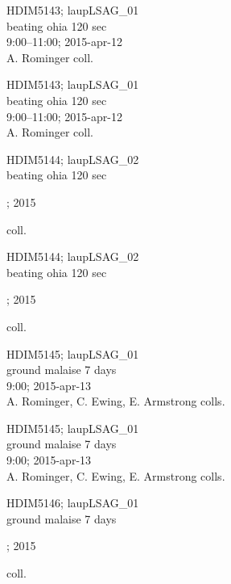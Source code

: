 \documentclass[6pt]{article}
\begin{document}
\noindent
\parbox{0.135\textwidth}{\tiny HDIM5143; laupLSAG\_01\\ beating ohia 120 sec\\ 9:00--11:00; 2015-apr-12\\ A. Rominger coll.}
\parbox{0.135\textwidth}{\tiny HDIM5143; laupLSAG\_01\\ beating ohia 120 sec\\ 9:00--11:00; 2015-apr-12\\ A. Rominger coll.}
\parbox{0.135\textwidth}{\tiny HDIM5144; laupLSAG\_02\\ beating ohia 120 sec\\ \rule{0ex}{0ex}\hspace{4.5em}; 2015\\ \rule{0ex}{0ex}\hspace{6em} coll.}
\parbox{0.135\textwidth}{\tiny HDIM5144; laupLSAG\_02\\ beating ohia 120 sec\\ \rule{0ex}{0ex}\hspace{4.5em}; 2015\\ \rule{0ex}{0ex}\hspace{6em} coll.}
\parbox{0.135\textwidth}{\tiny HDIM5145; laupLSAG\_01\\ ground malaise  7 days\\ 9:00; 2015-apr-13\\ A. Rominger, C. Ewing, E. Armstrong colls.}
\parbox{0.135\textwidth}{\tiny HDIM5145; laupLSAG\_01\\ ground malaise  7 days\\ 9:00; 2015-apr-13\\ A. Rominger, C. Ewing, E. Armstrong colls.}
\parbox{0.135\textwidth}{\tiny HDIM5146; laupLSAG\_01\\ ground malaise  7 days\\ \rule{0ex}{0ex}\hspace{4.5em}; 2015\\ \rule{0ex}{0ex}\hspace{6em} coll.} \\ 
\vspace{0.001in} 
\end{document}
